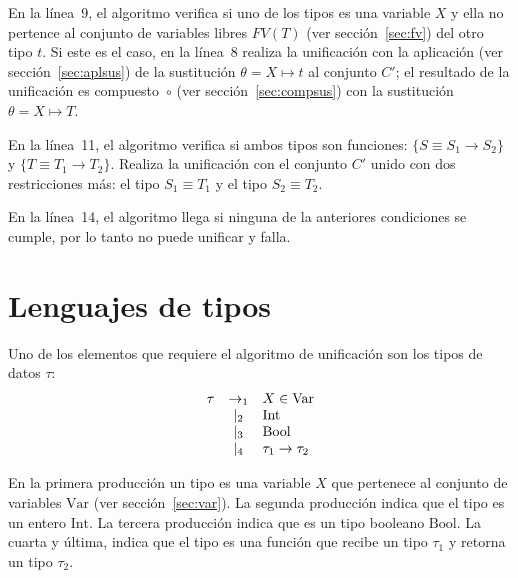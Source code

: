 \documentclass{article}
\theoremstyle{definition}
\begin{document}
En la línea~9, el algoritmo verifica si uno de los tipos es una
variable $X$ y ella no pertence al conjunto de variables libres
$FV(T)$ (ver sección~\ref{sec:fv}) del otro tipo $t$. Si este es el
caso, en la línea~8 realiza la unificación con la aplicación (ver
sección~\ref{sec:aplsus}) de la sustitución $\theta = X \mapsto t$ al
conjunto $C'$; el resultado de la unificación es compuesto~$\circ$
(ver sección~\ref{sec:compsus}) con la sustitución
$\theta = X \mapsto T$.

En la línea~11, el algoritmo verifica si ambos tipos son funciones:
$\{S \equiv S_1 \to S_2\}$ y $\{T \equiv T_1 \to T_2\}$. Realiza la
unificación con el conjunto $C'$ unido con dos restricciones más: el
tipo $S_1 \equiv T_1$ y el tipo $S_2 \equiv T_2$.

En la línea~14, el algoritmo llega si ninguna de la anteriores
condiciones se cumple, por lo tanto no puede unificar y falla.

\section{Lenguajes de tipos}\label{sec:lenguajetipos}

Uno de los elementos que requiere el algoritmo de unificación
son los tipos de datos $\tau$:
\begin{equation*}
  \begin{array}[h]{rcl}
    \tau & \to_1  & X \in \text{Var}
    \\
         & \mid_2 & \text{Int}
    \\
         & \mid_3 & \text{Bool}
    \\
         & \mid_4 & \tau_1 \to \tau_2
   \end{array}
\end{equation*}


En la primera producción un tipo es una variable $X$ que pertenece al
conjunto de variables $\text{Var}$ (ver sección~\ref{sec:var}). La
segunda producción indica que el tipo es un entero $\text{Int}$. La
tercera producción indica que es un tipo booleano $\text{Bool}$. La
cuarta y última, indica que el tipo es una función que recibe un tipo
$\tau_1$ y retorna un tipo $\tau_2$.
\end{document}
